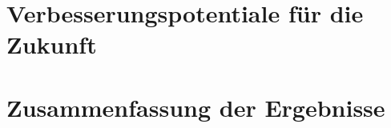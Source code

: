 \section{Verbesserungspotentiale für die Zukunft}\label{sec:VerbesserungspotentialeInteraktion}

\lipsum[4]

\section{Zusammenfassung der Ergebnisse}\label{sec:ZusammenfassungInteraktion}

\lipsum[4]

